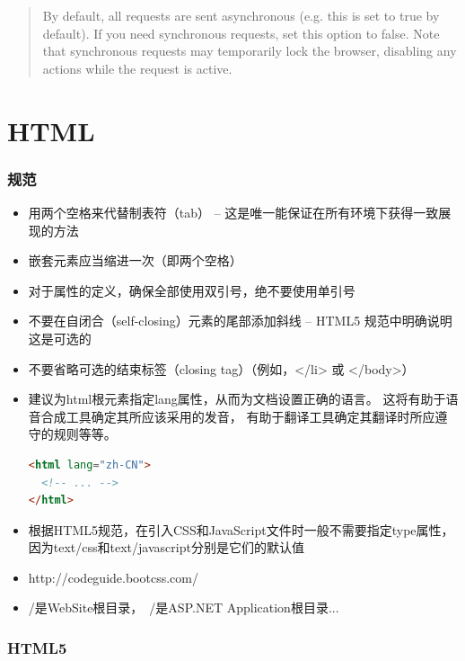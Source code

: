 \documentclass{book}
\begin{document}
\begin{quote}
By default, all requests are sent asynchronous (e.g. this is set to true by default). 
If you need synchronous requests, set this option to false. 
Note that synchronous requests may temporarily lock the browser, 
disabling any actions while the request is active.
\end{quote}


\chapter{HTML}


\subsection{规范}

\begin{itemize}
\item{用两个空格来代替制表符（tab） -- 这是唯一能保证在所有环境下获得一致展现的方法}
\item{嵌套元素应当缩进一次（即两个空格）}
\item{对于属性的定义，确保全部使用双引号，绝不要使用单引号}
\item{不要在自闭合（self-closing）元素的尾部添加斜线 -- HTML5 规范中明确说明这是可选的}
\item{不要省略可选的结束标签（closing tag）（例如，</li> 或 </body>）}
\item{建议为html根元素指定lang属性，从而为文档设置正确的语言。
这将有助于语音合成工具确定其所应该采用的发音，
有助于翻译工具确定其翻译时所应遵守的规则等等。}

\begin{lstlisting}[language=HTML]
<html lang="zh-CN">
  <!-- ... -->
</html>
\end{lstlisting}

\item{根据HTML5规范，在引入CSS和JavaScript文件时一般不需要指定type属性，
因为text/css和text/javascript分别是它们的默认值}

\item{http://codeguide.bootcss.com/}
\item{/是WebSite根目录，~/是ASP.NET Application根目录...}
\end{itemize}

\subsection{HTML5}
\end{document}
